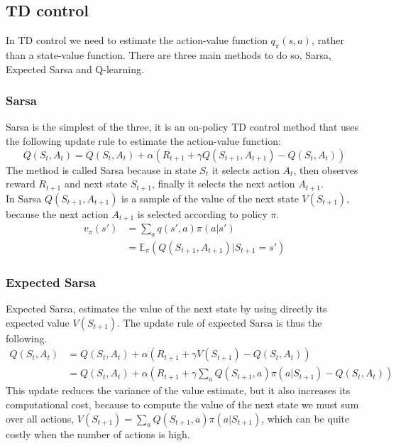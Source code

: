 \subsection{TD control}
In TD control we need to estimate the action-value function $q_{\pi}(s, a)$, rather than a state-value function. There are three main methods to do so, Sarsa, Expected Sarsa and Q-learning.

\subsubsection{Sarsa}
Sarsa is the simplest of the three, it is an on-policy TD control method that uses the following update rule to estimate the action-value function:
\begin{equation}
    Q(S_t, A_t) = Q(S_t, A_t) + \alpha (R_{t+1} + \gamma Q(S_{t+1}, A_{t+1}) - Q(S_t, A_t))
    \label{Sarsa-update}
\end{equation}
The method is called Sarsa because in state $S_t$ it selects action $A_t$, then observes reward $R_{t+1}$ and next state $S_{t+1}$, finally it selects the next action $A_{t+1}$.\\
In Sarsa $Q(S_{t+1}, A_{t+1})$ is a sample of the value of the next state $V(S_{t+1})$, because the next action $A_{t+1}$ is selected according to policy $\pi$.
\begin{equation*}
    \begin{split}
        v_{\pi}(s') & = \sum_a{q(s', a) \pi(a | s')} \\
        & = \mathds{E}_{\pi}(Q(S_{t+1}, A_{t+1}) | S_{t+1} = s')
    \end{split}
\end{equation*}

\subsubsection{Expected Sarsa}
Expected Sarsa, estimates the value of the next state by using directly its expected value $V(S_{t+1})$. The update rule of expected Sarsa is thus the following.
\begin{equation}
    \begin{split}
        Q(S_t, A_t) & = Q(S_t, A_t) + \alpha (R_{t+1} + \gamma V(S_{t+1}) - Q(S_t, A_t)) \\
        & = Q(S_t, A_t) + \alpha (R_{t+1} + \gamma \sum_a{Q(S_{t+1}, a) \pi(a | S_{t+1})} - Q(S_t, A_t))
    \end{split}
    \label{expected-Sarsa-update}
\end{equation}
This update reduces the variance of the value estimate, but it also increases its computational cost, because to compute the value of the next state we must sum over all actions, $V(S_{t+1}) = \sum_a{Q(S_{t+1}, a) \pi(a | S_{t+1})}$, which can be quite costly when the number of actions is high.

